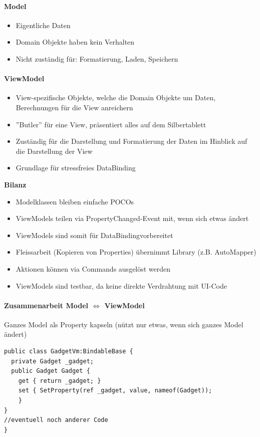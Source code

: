 \paragraph{Model} 
\begin{itemize}
    \item Eigentliche Daten
    \item Domain Objekte haben kein Verhalten
    \item Nicht zuständig für: Formatierung, Laden, Speichern
\end{itemize}

\paragraph{ViewModel} 
\begin{itemize}
    \item View-spezifische Objekte, welche die Domain Objekte um Daten, Berechnungen für die View anreichern
    \item ''Butler'' für eine View, präsentiert alles auf dem Silbertablett
    \item Zuständig für die Darstellung und Formatierung der Daten im Hinblick auf die Darstellung der View
    \item Grundlage für stressfreies DataBinding
\end{itemize}
\textbf{Bilanz}
\begin{itemize}
    \item Modelklassen bleiben einfache POCOs
    \item ViewModels teilen via PropertyChanged-Event mit, wenn sich etwas ändert
    \item ViewModels sind somit für DataBindingvorbereitet 
    \item Fleissarbeit (Kopieren von Properties) übernimmt Library (z.B. AutoMapper) 
    \item Aktionen können via Commands ausgelöst werden 
    \item ViewModels sind testbar, da keine direkte Verdrahtung mit UI-Code
\end{itemize}

\paragraph{Zusammenarbeit Model $\Leftrightarrow$ ViewModel}
Ganzes Model als Property kapseln (nützt nur etwas, wenn sich ganzes Model ändert)
\begin{lstlisting}[language=sharpc]
public class GadgetVm:BindableBase { 
  private Gadget _gadget;
  public Gadget Gadget { 
    get { return _gadget; }
    set { SetProperty(ref _gadget, value, nameof(Gadget));
    }
}
//eventuell noch anderer Code
} 
\end{lstlisting}


